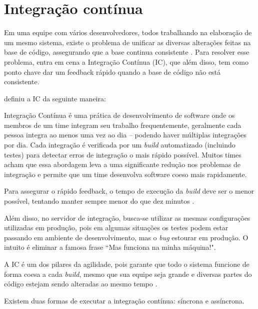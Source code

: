 


\section{Integração contínua} %
\label{sec:integracao_continua}

Em uma equipe com vários desenvolvedores, todos trabalhando na elaboração de um mesmo sistema, existe o problema de unificar as diversas alterações feitas na base de código, assegurando que a base continua consistente \cite{ImproveitCI}. Para resolver esse problema, entra em cena a Integração Contínua (IC), que além disso, tem como ponto chave dar um feedback rápido quando a base de código não está consistente.

\cite{FowlerCI} definiu a IC da seguinte maneira:

\begin{citacao}
Integração Contínua é uma prática de desenvolvimento de software onde os membros de um time integram seu trabalho frequentemente, geralmente cada pessoa integra ao menos uma vez ao dia – podendo haver múltiplas integrações por dia. Cada integração é verificada por um \textit{build} automatizado (incluindo testes) para detectar erros de integração o mais rápido possível. Muitos times acham que essa abordagem leva a uma significante redução nos problemas de integração e permite que um time desenvolva software coeso mais rapidamente.
\end{citacao}

Para assegurar o rápido feedback, o tempo de execução da \textit{build} deve ser o menor possível, tentando manter sempre menor do que dez minutos \cite{FowlerCI}.

Além disso, no servidor de integração, busca-se utilizar as mesmas configurações utilizadas em produção, pois em algumas situações os testes podem estar passando em ambiente de desenvolvimento, mas o \textit{bug} estourar em produção. O intuito é eliminar a famosa frase ``Mas funciona na minha máquina!".

A IC é um dos pilares da agilidade, pois garante que todo o sistema funcione de forma coesa a cada \textit{build}, mesmo que sua equipe seja grande e diversas partes do código estejam sendo alteradas ao mesmo tempo \cite{CaelumCI}.

Existem duas formas de executar a integração contínua: síncrona e assíncrona.

